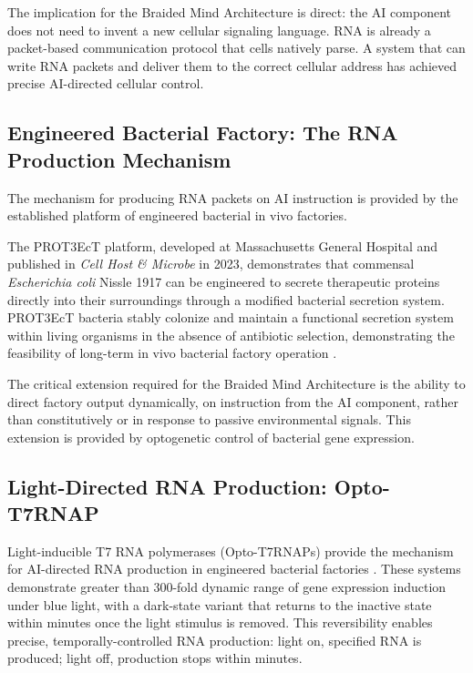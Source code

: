 \documentclass[12pt]{article}
\begin{document}
The implication for the Braided Mind Architecture is direct: the AI component does not need to invent a new cellular signaling language. RNA is already a packet-based communication protocol that cells natively parse. A system that can write RNA packets and deliver them to the correct cellular address has achieved precise AI-directed cellular control.

\subsection{Engineered Bacterial Factory: The RNA Production Mechanism}

The mechanism for producing RNA packets on AI instruction is provided by the established platform of engineered bacterial in vivo factories.

The PROT3EcT platform, developed at Massachusetts General Hospital and published in \textit{Cell Host \& Microbe} in 2023, demonstrates that commensal \textit{Escherichia coli} Nissle 1917 can be engineered to secrete therapeutic proteins directly into their surroundings through a modified bacterial secretion system. PROT3EcT bacteria stably colonize and maintain a functional secretion system within living organisms in the absence of antibiotic selection, demonstrating the feasibility of long-term in vivo bacterial factory operation \cite{prot3ect_2023}.

The critical extension required for the Braided Mind Architecture is the ability to direct factory output dynamically, on instruction from the AI component, rather than constitutively or in response to passive environmental signals. This extension is provided by optogenetic control of bacterial gene expression.

\subsection{Light-Directed RNA Production: Opto-T7RNAP}

Light-inducible T7 RNA polymerases (Opto-T7RNAPs) provide the mechanism for AI-directed RNA production in engineered bacterial factories \cite{opto_t7rnap_2017}. These systems demonstrate greater than 300-fold dynamic range of gene expression induction under blue light, with a dark-state variant that returns to the inactive state within minutes once the light stimulus is removed. This reversibility enables precise, temporally-controlled RNA production: light on, specified RNA is produced; light off, production stops within minutes.
\end{document}
